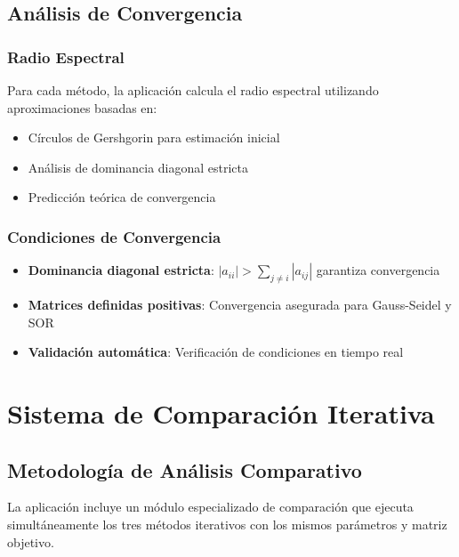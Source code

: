 \subsection{Análisis de Convergencia}

\subsubsection{Radio Espectral}
Para cada método, la aplicación calcula el radio espectral utilizando aproximaciones basadas en:
\begin{itemize}
    \item Círculos de Gershgorin para estimación inicial
    \item Análisis de dominancia diagonal estricta
    \item Predicción teórica de convergencia
\end{itemize}

\subsubsection{Condiciones de Convergencia}
\begin{itemize}
    \item \textbf{Dominancia diagonal estricta}: $|a_{ii}| > \sum_{j \neq i} |a_{ij}|$ garantiza convergencia
    \item \textbf{Matrices definidas positivas}: Convergencia asegurada para Gauss-Seidel y SOR
    \item \textbf{Validación automática}: Verificación de condiciones en tiempo real
\end{itemize}

\section{Sistema de Comparación Iterativa}

\subsection{Metodología de Análisis Comparativo}

La aplicación incluye un módulo especializado de comparación que ejecuta simultáneamente los tres métodos iterativos con los mismos parámetros y matriz objetivo.

